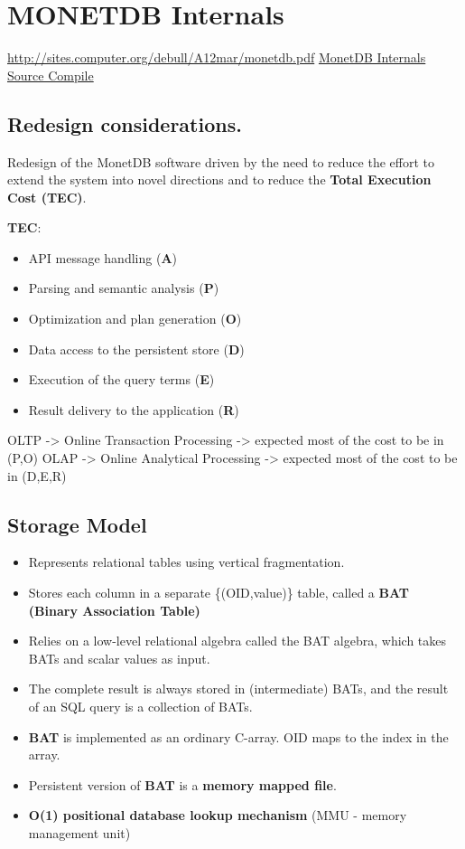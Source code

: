 \documentclass[11pt]{article}
\author{Lucas Pereira}
\date{\today}
\title{}
\begin{document}
\tableofcontents


\section{MONETDB Internals}
\label{sec:org28ecd8e}

\url{http://sites.computer.org/debull/A12mar/monetdb.pdf}
\href{https://www.monetdb.org/Documentation/MonetDBInternals/Overview}{MonetDB Internals}
\href{https://www.monetdb.org/Developers/SourceCompile}{Source Compile}

\subsection{Redesign considerations.}
\label{sec:orgae98017}
Redesign of the MonetDB software driven by the need to reduce the effort to extend the system into novel directions and to reduce
the \textbf{Total Execution Cost (TEC)}.

\textbf{TEC}:
\begin{itemize}
\item API message handling                (\textbf{A})
\item Parsing and semantic analysis       (\textbf{P})
\item Optimization and plan generation    (\textbf{O})
\item Data access to the persistent store (\textbf{D})
\item Execution of the query terms        (\textbf{E})
\item Result delivery to the application  (\textbf{R})
\end{itemize}

OLTP -> Online Transaction Processing -> expected most of the cost to be in (P,O)
OLAP -> Online Analytical Processing  -> expected most of the cost to be in (D,E,R)

\subsection{Storage Model}
\label{sec:org7b010c7}
\begin{itemize}
\item Represents relational tables using vertical fragmentation.
\item Stores each column in a separate \{(OID,value)\} table,  called a \textbf{BAT (Binary Association Table)}
\item Relies on a low-level relational algebra called the BAT algebra, which takes BATs and scalar values as input.
\item The complete result is always stored in (intermediate) BATs, and the result of an SQL query is a collection of BATs.

\item \textbf{BAT} is implemented as an ordinary C-array. OID maps to the index in the array.
\item Persistent version of \textbf{BAT} is a \textbf{memory mapped file}.
\item \textbf{O(1) positional database lookup mechanism} (MMU - memory management unit)
\end{itemize}
\end{document}
